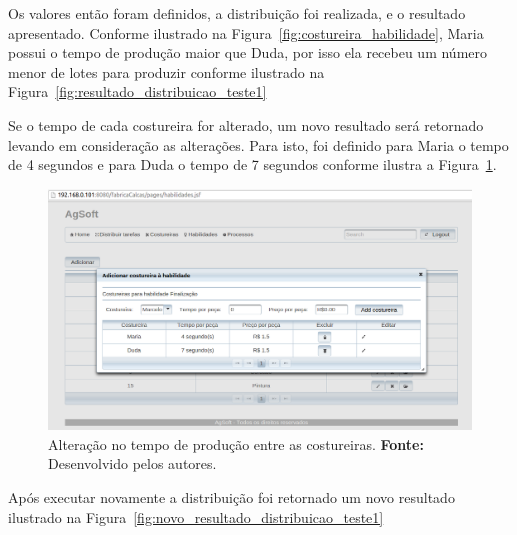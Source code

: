\par Os valores então foram definidos, a distribuição foi realizada, e o resultado apresentado. 
Conforme ilustrado na Figura~\ref{fig:costureira_habilidade}, Maria possui
o tempo de produção maior que Duda, por isso ela recebeu um número menor de lotes
para produzir conforme ilustrado na Figura~\ref{fig:resultado_distribuicao_teste1}

\par Se o tempo de cada costureira for alterado, um novo resultado será
retornado levando em consideração as alterações. Para isto, foi definido para
Maria o tempo de 4 segundos e para Duda o tempo de 7 segundos conforme ilustra a
Figura~\ref{fig:tempo_costureiras}. 



\begin{figure}[h!]
	\centerline{\includegraphics[scale=0.3]{./imagens/alterando_tempo_costureira.png}}
	\caption[Alteração no tempo de produção entre as costureiras.]
	{Alteração no tempo de produção entre as costureiras. \textbf{Fonte:}
	Desenvolvido pelos autores.}
	\label{fig:tempo_costureiras}
\end{figure}

\par Após executar novamente a distribuição foi retornado um novo resultado
ilustrado na Figura~\ref{fig:novo_resultado_distribuicao_teste1}

\newpage

